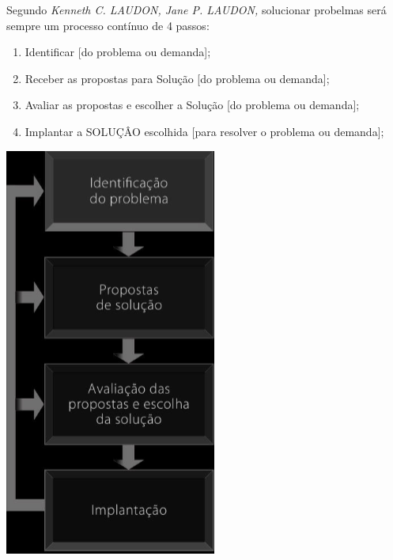 \documentclass[
]{book}
\begin{document}
Segundo \emph{Kenneth C. LAUDON, Jane P. LAUDON,} solucionar probelmas será sempre um processo contínuo de 4 passos:

\begin{enumerate}
\def\labelenumi{\arabic{enumi}.}
\item
  Identificar {[}do problema ou demanda{]};
\item
  Receber as propostas para Solução {[}do problema ou demanda{]};
\item
  Avaliar as propostas e escolher a Solução {[}do problema ou demanda{]};
\item
  Implantar a SOLUÇÂO escolhida {[}para resolver o problema ou demanda{]};
\end{enumerate}

\includegraphics{images/clipboard-3657052893.png}
\end{document}

